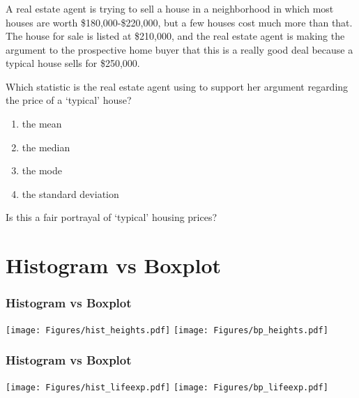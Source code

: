 \begin{frame}
\frametitle{\grp}
A real estate agent is trying to sell a house in a neighborhood in which most houses are worth \$180,000-\$220,000, but a few houses cost much more than that. The house for sale is listed at \$210,000, and the real estate agent is making the argument to the prospective home buyer that this is a really good deal because a typical house sells for \$250,000.
\begin{clicker}{Which statistic is the real estate agent using to support her argument regarding the price of a `typical' house?}
\begin{enumerate}
    \item
    the mean
    \item
    the median
    \item
    the mode
    \item
    the standard deviation
\end{enumerate}
\end{clicker}
\vspace{10pt}
Is this a fair portrayal of `typical' housing prices?
\end{frame}


\section[Histogram vs Boxplot]{Histogram vs Boxplot}
\begin{frame}
\end{frame}


\begin{frame}
\frametitle{Histogram vs Boxplot}
\texttt{[image: Figures/hist\_heights.pdf]}
\texttt{[image: Figures/bp\_heights.pdf]}
\end{frame}

\begin{frame}
\frametitle{Histogram vs Boxplot}
\texttt{[image: Figures/hist\_lifeexp.pdf]}
\texttt{[image: Figures/bp\_lifeexp.pdf]}
\end{frame}

